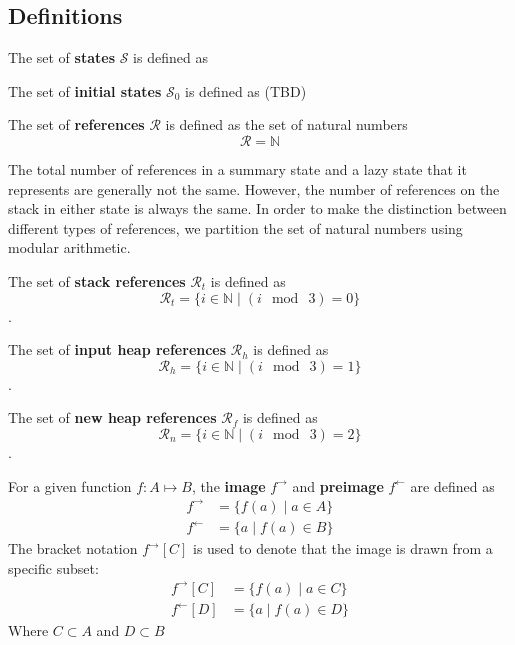 \subsection{Definitions}

\begin{definition}
\label{def:state}
The set of \textbf{states} $\mathcal{S}$ is defined as
\end{definition}

\begin{definition}
\label{def:initate}
The set of \textbf{initial states} $\mathcal{S}_0$ is defined as (TBD)
\end{definition}

\begin{definition}
The set of \textbf{references} $\mathcal{R}$ is defined as the set of natural numbers
 $$\mathcal{R} = \mathbb{N}$$
\end{definition}

The total number of references in a summary state and a lazy state that it represents are generally not the same. However, the number of references on the stack in either state is always the same. In order to make the distinction between different types of references, we partition the set of natural numbers using modular arithmetic.

\begin{definition}
The set of \textbf{stack references} $\mathcal{R}_t$ is defined as
 $$\mathcal{R}_t =\{i \in \mathbb{N} \mid ( i\ \bmod\ 3 ) = 0\}$$. 
\end{definition}

\begin{definition}
The set of \textbf{input heap references} $\mathcal{R}_h$ is defined as
 $$\mathcal{R}_h =\{i \in \mathbb{N} \mid ( i\ \bmod\ 3 ) = 1\}$$. 
\end{definition}

\begin{definition}
The set of \textbf{new heap references} $\mathcal{R}_f$ is defined as
 $$\mathcal{R}_n =\{i \in \mathbb{N} \mid ( i\ \bmod\ 3 ) = 2\}$$. 
\end{definition}

\begin{definition}
For a given function $f:A \mapsto B$, the \textbf{image} $f^\rightarrow$ and \textbf{preimage} $f^\leftarrow$ are defined as
\begin{align}
 f^\rightarrow &= \{ f(a) \mid a \in A\}\\
 f^\leftarrow &= \{ a \mid f(a) \in B \}
 \end{align}
 The bracket notation $ f^\rightarrow [C] $ is used to denote that the image is drawn from a specific subset:
 \begin{align}
 f^\rightarrow [C] &= \{ f(a) \mid a \in C\}\\
 f^\leftarrow [D] &= \{ a \mid f(a) \in D \}
 \end{align}
 Where $C \subset A$ and $D \subset B$
\end{definition}

